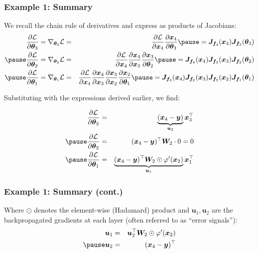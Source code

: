 \documentclass[smaller, handout]{beamer}
\begin{document}
\begin{frame}
  \frametitle{Example 1: Summary}\pause
 We recall the chain rule of derivatives and express as products of Jacobians:  
 \begin{eqnarray}
    \pd{\mc L}{\bm\th_3} = \nabla_{\bm\th_3}\mc L &=& \pd{\mc L}{\bm x_4} \pd{\bm x_4}{\bm\th_3} \pause = 
    \bm J_{\bm f_4}(\bm x_4) \bm J_{\bm f_3}(\bm \th_3) \\\pause
    \pd{\mc L}{\bm\th_2}  = \nabla_{\bm\th_2}\mc L &=& \pd{\mc L}{\bm x_4} \pd{\bm x_4}{\bm x_3} \pd{\bm x_3}{\bm\th_2} \pause =
    \bm J_{\bm f_4}(\bm x_4) \bm J_{\bm f_3}(\bm x_3) \bm J_{\bm f_2}(\bm\th_2) \\ \pause
    \pd{\mc L}{\bm\th_1}  = \nabla_{\bm\th_1}\mc L &=& \pd{\mc L}{\bm x_4} \pd{\bm x_4}{\bm x_3} \pd{\bm x_3}{\bm x_2} \pd{\bm x_2}{\bm\th_1} \pause  = 
    \bm J_{\bm f_4}(\bm x_4) \bm J_{\bm f_3}(\bm x_3) \bm J_{\bm f_2}(\bm x_2) \bm J_{\bm f_1}(\bm\th_1)
  \end{eqnarray}

Substituting with the expressions derived earlier, we find: 

\begin{eqnarray}
    \pd{\mc L}{\bm\th_3} &=& \underbrace{(\bm x_4 - \bm y)}_{\bm u_2} \bm x_3\tr \\\pause
    \pd{\mc L}{\bm\th_2} &=& (\bm x_4 - \bm y)\tr \bm W_2 \cdot 0 = 0 \\ \pause
    \pd{\mc L}{\bm\th_1} &=& \underbrace{(\bm x_4 - \bm y)\tr \bm W_2 \odot \varphi'(\bm x_2)}_{\bm u_1}  \bm x_1\tr
\end{eqnarray}
  
\end{frame}

\begin{frame}
  \frametitle{Example 1: Summary (cont.)}\pause
Where $\odot$ denotes the element-wise (Hadamard) product and $\bm u_1, \bm u_2$ are the backpropagated gradients at each layer (often referred to as ``error signals''):
\begin{eqnarray}
  \bm u_1 &=& \bm u_2 \tr \bm W_2 \odot \varphi'(\bm x_2) \\\pause
  \bm u_2 &=& (\bm x_4 - \bm y)\tr
\end{eqnarray}
\end{frame}
\end{document}
